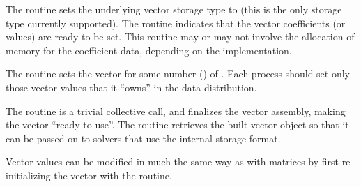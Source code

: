 The  routine sets the underlying vector storage
type to  (this is the only storage type currently
supported).  The  routine indicates that the vector
coefficients (or values) are ready to be set.  This routine may or may
not involve the allocation of memory for the coefficient data,
depending on the implementation.

The  routine sets the vector  for some
number () of .  Each process should set
only those vector values that it ``owns'' in the data distribution.

The  routine is a trivial collective call, and
finalizes the vector assembly, making the vector ``ready to use''.
The  routine retrieves the built vector object so
that it can be passed on to \hypre{} solvers that use the
 internal storage format.

Vector values can be modified in much the same way as with matrices by
first re-initializing the vector with the  routine.
